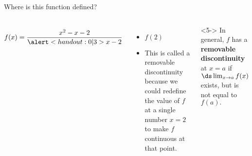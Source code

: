 \begin{frame}
\begin{example} %
Where is this function defined?
\begin{columns}[c]
\[
f(x) = \frac{x^2 - x - 2}{\alert<handout:0 |3>{x - 2}}
\]
\ 
\begin{itemize} \frametitle{Removable Discontinuity}
\item<2-| alert@2-3>  $f(2)$ 
\item<4->  This is called a removable discontinuity because we could redefine the value of $f$ at a single number $x = 2$ to make $f$  continuous at that point.
\end{itemize}
\begin{definition}<5->
In general, $ f $ has a \textbf{removable discontinuity} at $ x=a $ if $ \ds \lim_{x\to a}f(x) $ exists, but is not equal to $ f(a). $
\end{definition}
\end{columns}
\end{example}
\end{frame}


